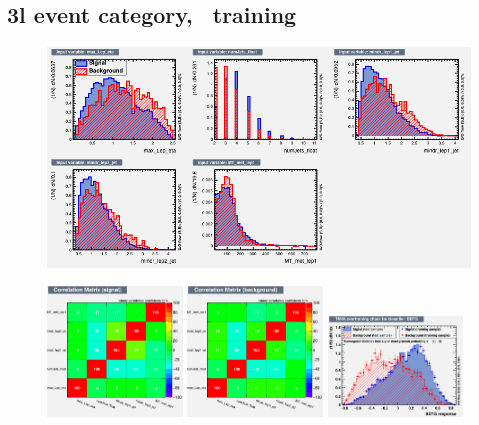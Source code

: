 \clearpage

\subsection*{3l event category, \ttbar\ training}
\begin{figure}[htb]
 \centering
 \includegraphics[width=\textwidth]{plots_extraction/training/train_3l_ttbar/variables_id_c1}\\
\end{figure}
\begin{figure}[htb]
 \includegraphics[width=0.32\textwidth]{plots_extraction/training/train_3l_ttbar/CorrelationMatrixS}
 \includegraphics[width=0.32\textwidth]{plots_extraction/training/train_3l_ttbar/CorrelationMatrixB}
 \includegraphics[width=0.32\textwidth]{plots_extraction/training/train_3l_ttbar/overtrain_BDTG.png}
\end{figure}

